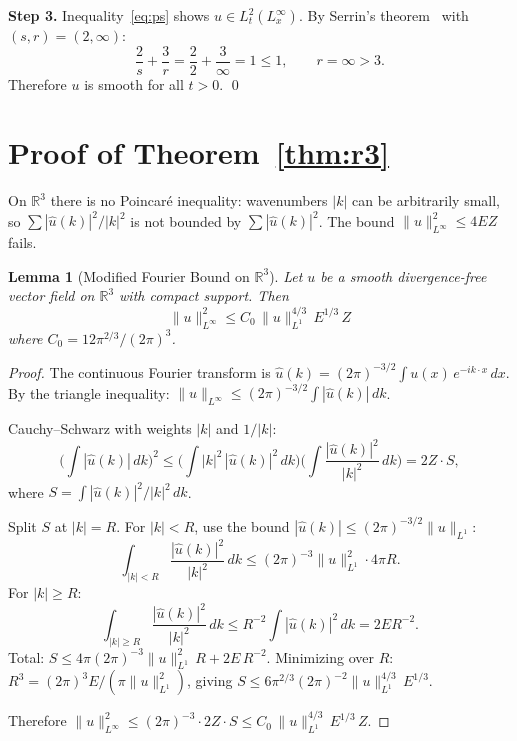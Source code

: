 \documentclass[11pt]{article}
\newtheorem{lemma}[theorem]{Lemma}
\theoremstyle{definition}
\theoremstyle{remark}
\begin{document}
\textbf{Step 3.} Inequality~\eqref{eq:ps} shows $u \in
L^2_t(L^\infty_x)$. By Serrin's theorem~\cite{serrin} with
$(s,r) = (2,\infty)$:
\[
  \frac{2}{s} + \frac{3}{r} = \frac{2}{2} + \frac{3}{\infty} = 1 \le 1,
  \qquad r = \infty > 3.
\]
Therefore $u$ is smooth for all $t > 0$. \qed

\section{Proof of Theorem~\ref{thm:r3}}

On $\mathbb{R}^3$ there is no Poincar\'e inequality: wavenumbers
$|k|$ can be arbitrarily small, so
$\sum |\hat{u}(k)|^2/|k|^2$ is not bounded by
$\sum |\hat{u}(k)|^2$. The bound $\|u\|_{L^\infty}^2 \le 4EZ$
fails.

\begin{lemma}[Modified Fourier Bound on $\mathbb{R}^3$]\label{lem:r3}
Let $u$ be a smooth divergence-free vector field on
$\mathbb{R}^3$ with compact support. Then
\begin{equation}\label{eq:r3bound}
  \|u\|_{L^\infty}^2 \le C_0\,\|u\|_{L^1}^{4/3}\,E^{1/3}\,Z
\end{equation}
where $C_0 = 12\pi^{2/3}/(2\pi)^3$.
\end{lemma}

\begin{proof}
The continuous Fourier transform is
$\hat{u}(k) = (2\pi)^{-3/2}\int u(x)\,e^{-ik \cdot x}\,dx$.
By the triangle inequality:
$\|u\|_{L^\infty} \le (2\pi)^{-3/2}\int |\hat{u}(k)|\,dk$.

Cauchy--Schwarz with weights $|k|$ and $1/|k|$:
\[
  \biggl(\int |\hat{u}(k)|\,dk\biggr)^2
  \le \biggl(\int |k|^2\,|\hat{u}(k)|^2\,dk\biggr)
       \biggl(\int \frac{|\hat{u}(k)|^2}{|k|^2}\,dk\biggr)
  = 2Z \cdot S,
\]
where $S = \int |\hat{u}(k)|^2/|k|^2\,dk$.

Split $S$ at $|k| = R$. For $|k| < R$, use the bound
$|\hat{u}(k)| \le (2\pi)^{-3/2}\|u\|_{L^1}$:
\[
  \int_{|k|<R} \frac{|\hat{u}(k)|^2}{|k|^2}\,dk
  \le (2\pi)^{-3}\|u\|_{L^1}^2 \cdot 4\pi R.
\]
For $|k| \ge R$:
\[
  \int_{|k|\ge R} \frac{|\hat{u}(k)|^2}{|k|^2}\,dk
  \le R^{-2} \int |\hat{u}(k)|^2\,dk = 2ER^{-2}.
\]
Total: $S \le 4\pi(2\pi)^{-3}\|u\|_{L^1}^2\,R + 2E\,R^{-2}$.
Minimizing over $R$:
$R^3 = (2\pi)^3 E/(\pi\|u\|_{L^1}^2)$, giving
$S \le 6\pi^{2/3}(2\pi)^{-2}\|u\|_{L^1}^{4/3}\,E^{1/3}$.

Therefore
$\|u\|_{L^\infty}^2 \le (2\pi)^{-3} \cdot 2Z \cdot S \le
C_0\,\|u\|_{L^1}^{4/3}\,E^{1/3}\,Z$.
\end{proof}
\end{document}
